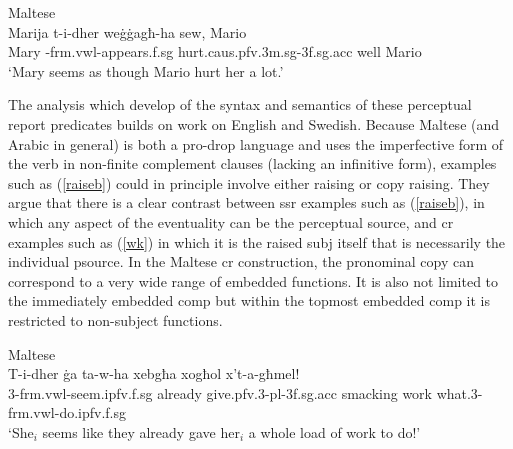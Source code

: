 \documentclass[output=paper,hidelinks]{langscibook}
\begin{document}
\ea
\label{mario1} Maltese  \citep[195]{CES:LFG14} \\
\gll
 Marija t-i-dher  we{\.g}{\.g}agħ-ha sew, Mario\\
Mary {-frm.vwl}-appears.{\sc f.sg}  hurt.{\sc caus.pfv.3m.sg-3f.sg.acc} well Mario\\
\glt `Mary seems as though Mario hurt her a lot.'
\z







The analysis which \citet{CES:LFG14}
develop of the syntax and semantics of these perceptual report predicates builds on  work on English and Swedish.  Because Maltese (and Arabic in general) is both a pro-drop language and
 uses the imperfective form of the verb in non-finite complement  clauses (lacking an infinitive form),  examples such as (\ref{raiseb}) could   in principle involve either raising or copy raising.  They  argue that there is a clear contrast between {\sc ssr} examples such as  (\ref{raiseb}), in which any aspect of the eventuality can be the perceptual source, and {\sc cr} examples such as (\ref{wk}) in which it is the raised
{\sc subj} itself that is necessarily the individual {\sc psource}. In the Maltese {\sc cr} construction, the pronominal copy can correspond to a very wide range of embedded functions.  It is also not limited to the immediately embedded {\sc comp} but within the topmost embedded {\sc comp} it is restricted to non-subject functions.

\newpage

\ea \label{wk} Maltese \citep[192]{CES:LFG14}\\
\gll T-i-dher {\.g}a ta-w-ha xebgħa xogħol x't-a-għmel!\\
3-{\sc frm.vwl}-seem.{\sc ipfv.f.sg} already give.{\sc pfv.3-pl-3f.sg.acc} smacking work what.3-{\sc frm.vwl}-do.{\sc ipfv.f.sg}\\
\glt `She$_{i}$ seems like they already gave her$_{i}$ a whole load of work
to do!'
\z
\end{document}
